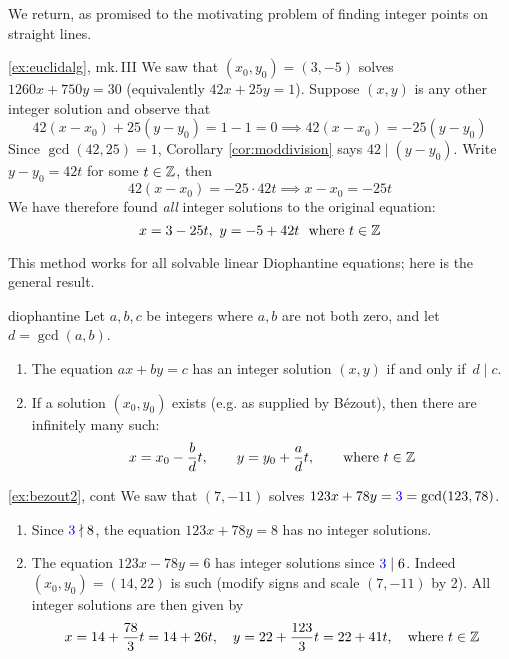 \goodbreak


We return, as promised to the motivating problem of finding integer points on straight lines.

\begin{example*}{\ref{ex:euclidalg}, mk.\,III}{}
	We saw that $(x_0,y_0)=(3,-5)$ solves $1260x+750y=30$ (equivalently $42x+25y=1$). Suppose $(x,y)$ is any other integer solution and observe that
	\[
		42(x-x_0)+25(y-y_0)=1-1=0 \implies 42(x-x_0)=-25(y-y_0)
	\]
	Since $\gcd(42,25)=1$, Corollary \ref{cor:moddivision} says $42\mid(y-y_0)$. Write $y-y_0=42t$ for some $t\in\mathbb{Z}$, then
	\[
		42(x-x_0)=-25\cdot 42t\implies x-x_0=-25t
	\]
	We have therefore found \emph{all} integer solutions to the original equation:
	\[
		x=3-25t,\ y=-5+42t\ \text{ where }t\in\mathbb{Z}
	\]
\end{example*}


This method works for all solvable linear Diophantine equations; here is the general result.

\begin{thm}{}{diophantine}
	Let $a,b,c$ be integers where $a,b$ are not both zero, and let $d=\gcd(a,b)$.
	\begin{enumerate}\itemsep0pt
	  \item The equation $ax+by=c$ has an integer solution $(x,y)$ if and only if $\,d\mid c$.
	  \item If a solution $(x_0,y_0)$ exists (e.g. as supplied by Bézout), then there are infinitely many such:%
		\[
			x=x_0-\frac bd t,\qquad y=y_0+\frac ad t,\qquad \text{where }t\in\mathbb{Z}
		\]
	\end{enumerate} 
\end{thm}


\begin{example*}{\ref{ex:bezout2}, cont}{}
	We saw that $(7,-11)$ solves $123x+78y=\textcolor{blue}{3}=\gcd(123,78)$.
	\begin{enumerate}
	  \item Since $\textcolor{blue}{3}\nmid 8$, the equation $123x+78y=8$ has no integer solutions.
	  \item The equation $123x-78y=6$ has integer solutions since $\textcolor{blue}{3}\mid 6$. Indeed $(x_0,y_0)=(14,22)$ is such (modify signs and scale $(7,-11)$ by 2). All integer solutions are then given by
	  \[
	  	x=14+\frac{78}3t=14+26t,\quad y=22+\frac{123}3t=22+41t,\quad\text{where }t\in\mathbb{Z}
	  \]
	\end{enumerate}
\end{example*}

